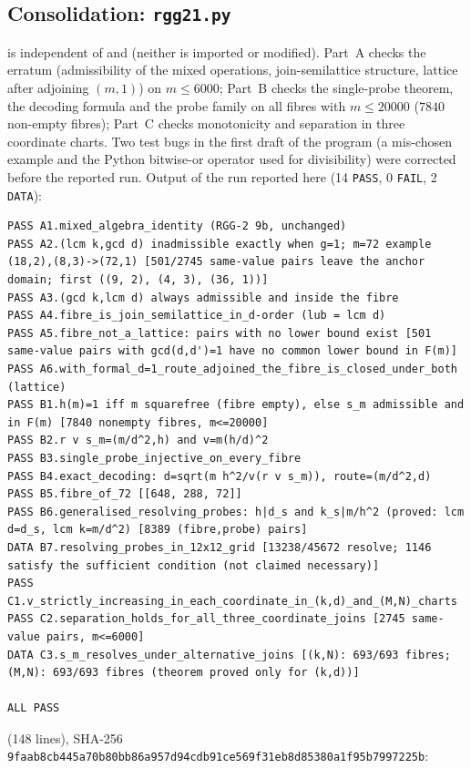 \documentclass[11pt,a4paper]{article}
\theoremstyle{plain}
\theoremstyle{definition}
\begin{document}
\subsection{Consolidation: \texttt{rgg21.py}}\label{sec:rgg21}
 is independent of  and  (neither is imported or modified). Part~A checks the erratum (admissibility of the mixed operations, join-semilattice structure, lattice after adjoining $(m,1)$) on $m\le6000$; Part~B checks the single-probe theorem, the decoding formula and the probe family on all fibres with $m\le20000$ ($7840$ non-empty fibres); Part~C checks monotonicity and separation in three coordinate charts. Two test bugs in the first draft of the program (a mis-chosen example and the Python bitwise-or operator used for divisibility) were corrected before the reported run.
Output of the run reported here (14 \texttt{PASS}, 0 \texttt{FAIL}, 2 \texttt{DATA}):
\begin{lstlisting}[numbers=none,xleftmargin=0pt,basicstyle=\ttfamily\tiny,breaklines=true]
PASS A1.mixed_algebra_identity (RGG-2 9b, unchanged)
PASS A2.(lcm k,gcd d) inadmissible exactly when g=1; m=72 example (18,2),(8,3)->(72,1) [501/2745 same-value pairs leave the anchor domain; first ((9, 2), (4, 3), (36, 1))]
PASS A3.(gcd k,lcm d) always admissible and inside the fibre
PASS A4.fibre_is_join_semilattice_in_d-order (lub = lcm d)
PASS A5.fibre_not_a_lattice: pairs with no lower bound exist [501 same-value pairs with gcd(d,d')=1 have no common lower bound in F(m)]
PASS A6.with_formal_d=1_route_adjoined_the_fibre_is_closed_under_both (lattice)
PASS B1.h(m)=1 iff m squarefree (fibre empty), else s_m admissible and in F(m) [7840 nonempty fibres, m<=20000]
PASS B2.r v s_m=(m/d^2,h) and v=m(h/d)^2
PASS B3.single_probe_injective_on_every_fibre
PASS B4.exact_decoding: d=sqrt(m h^2/v(r v s_m)), route=(m/d^2,d)
PASS B5.fibre_of_72 [[648, 288, 72]]
PASS B6.generalised_resolving_probes: h|d_s and k_s|m/h^2 (proved: lcm d=d_s, lcm k=m/d^2) [8389 (fibre,probe) pairs]
DATA B7.resolving_probes_in_12x12_grid [13238/45672 resolve; 1146 satisfy the sufficient condition (not claimed necessary)]
PASS C1.v_strictly_increasing_in_each_coordinate_in_(k,d)_and_(M,N)_charts
PASS C2.separation_holds_for_all_three_coordinate_joins [2745 same-value pairs, m<=6000]
DATA C3.s_m_resolves_under_alternative_joins [(k,N): 693/693 fibres; (M,N): 693/693 fibres (theorem proved only for (k,d))]

ALL PASS
\end{lstlisting}
\par\smallskip\noindent{} (148 lines), SHA-256 \texttt{\scriptsize 9faab8cb445a70b80bb86a957d94cdb91ce569f31eb8d85380a1f95b7997225b}:
\end{document}
